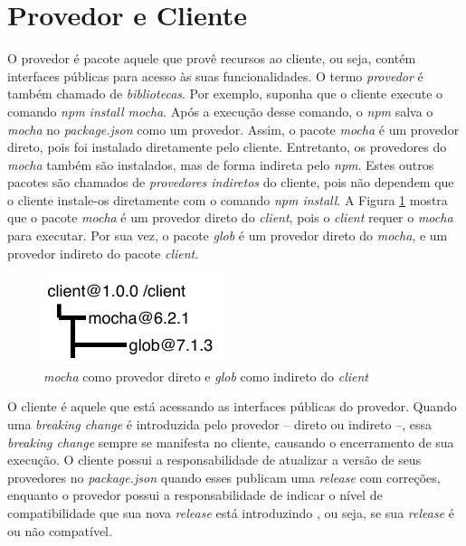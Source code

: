 \section{Provedor e Cliente}
\label{ref-teo:prov_clie}
O provedor é pacote aquele que provê recursos ao cliente, ou seja, contém interfaces públicas para acesso às suas funcionalidades. O termo \textit{provedor} é também chamado de \textit{bibliotecas}. Por exemplo, suponha que o cliente execute o comando \textit{npm install mocha}. Após a execução desse comando, o \textit{npm} salva o \textit{mocha} no \textit{package.json} como um provedor. Assim, o pacote \textit{mocha} é um provedor direto, pois foi instalado diretamente pelo cliente. Entretanto, os provedores do \textit{mocha} também são instalados, mas de forma indireta pelo \textit{npm}. Estes outros pacotes são chamados de \textit{provedores indiretos} do cliente, pois não dependem que o cliente instale-os diretamente com o comando \textit{npm install}. A Figura \ref{fig:provider} mostra que o pacote \textit{mocha} é um provedor direto do \textit{client}, pois o \textit{client} requer o \textit{mocha} para executar. Por sua vez, o pacote \textit{glob} é um provedor direto do \textit{mocha}, e um provedor indireto do pacote \textit{client}.

\begin{figure}
    \centering
    \includegraphics[scale=1.4]{figuras/provider_directly_undirectly.pdf}
    \caption{\textit{mocha} como provedor direto e \textit{glob} como indireto do \textit{client}}
    \label{fig:provider}
\end{figure}{}

O cliente é aquele que está acessando as interfaces públicas do provedor. Quando uma \textit{breaking change} é introduzida pelo provedor -- direto ou indireto --, essa \textit{breaking change} sempre se manifesta no cliente, causando o encerramento de sua execução. O cliente possui a responsabilidade de atualizar a versão de seus provedores no \textit{package.json} quando esses publicam uma \textit{release} com correções, enquanto o provedor possui a responsabilidade de indicar o nível de compatibilidade que sua nova \textit{release} está introduzindo \cite{teorical_reference:semver}, ou seja, se sua \textit{release} é ou não compatível.

